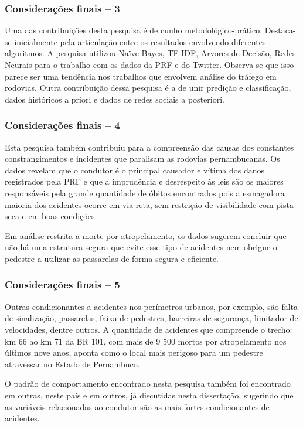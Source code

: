 \documentclass[11pt]{beamer}
\begin{document}
\begin{frame}
   \frametitle{Considerações finais -- 3}
   Uma das contribuições desta pesquisa é de cunho metodológico-prático. Destaca-se inicialmente pela articulação entre os resultados envolvendo diferentes algoritmos. A pesquisa utilizou Naïve Bayes, TF-IDF, Arvores de Decisão, Redes Neurais para o trabalho com os dados da PRF e do Twitter. Observa-se que isso parece ser uma tendência nos trabalhos que envolvem análise do tráfego em rodovias.
   Outra contribuição dessa pesquisa é a de unir predição e classificação, dados históricos a priori e dados de redes sociais a posteriori.

	
\end{frame}

\begin{frame}
	\frametitle{Considerações finais -- 4}
	Esta pesquisa também contribuiu para a compreensão das causas dos constantes constrangimentos e incidentes que paralisam as rodovias pernambucanas.
	Os dados revelam que o condutor é o principal causador e vítima dos danos registrados pela PRF e que a imprudência e desrespeito às leis são os maiores responsáveis pela grande quantidade de óbitos encontrados pois a esmagadora maioria dos acidentes ocorre em via reta, sem restrição de visibilidade com pista seca e em boas condições.
	
	Em análise restrita a morte por atropelamento, os dados sugerem concluir que não há uma estrutura segura que evite esse tipo de acidentes nem obrigue o pedestre a utilizar as passarelas de forma segura e eficiente.
	
\end{frame}

\begin{frame}
	\frametitle{Considerações finais -- 5}
  Outras condicionantes a acidentes nos perímetros urbanos, por exemplo, são falta de sinalização, passarelas, faixa de pedestres, barreiras de segurança, limitador de velocidades, dentre outros. A quantidade de acidentes que compreende o  trecho: km 66 ao km 71 da BR 101, com mais de 9 500 mortos por atropelamento nos últimos nove anos, aponta como o local mais perigoso para um pedestre atravessar no Estado de Pernambuco.
  
  O padrão de comportamento encontrado nesta pesquisa também foi encontrado em outras, neste país e em outros, já discutidas nesta dissertação, sugerindo que as variáveis relacionadas ao condutor são as mais fortes condicionantes de acidentes.  
	
\end{frame}
\end{document}
